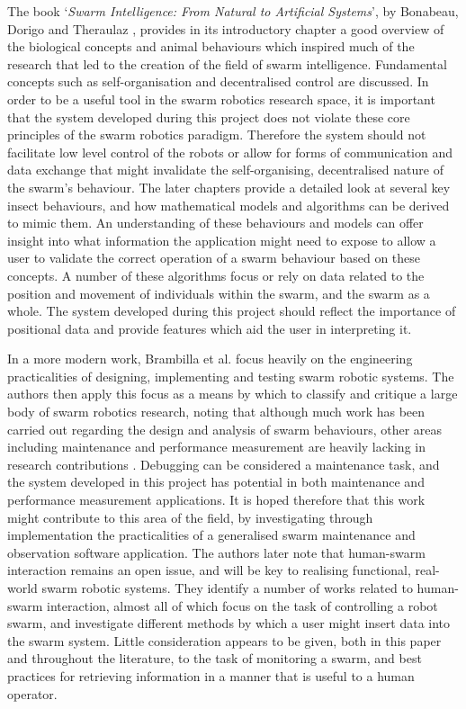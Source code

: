 The book `\textit{Swarm Intelligence: From Natural to Artificial Systems}', by Bonabeau, Dorigo and Theraulaz \cite{Bonabeau:1999}, provides in its introductory chapter a good overview of the biological concepts and animal behaviours which inspired much of the research that led to the creation of the field of swarm intelligence. Fundamental concepts such as self-organisation and decentralised control are discussed. In order to be a useful tool in the swarm robotics research space, it is important that the system developed during this project does not violate these core principles of the swarm robotics paradigm. Therefore the system should not facilitate low level control of the robots or allow for forms of communication and data exchange that might invalidate the self-organising, decentralised nature of the swarm's behaviour. The later chapters \cite{Bonabeau:1999} provide a detailed look at several key insect behaviours, and how mathematical models and algorithms can be derived to mimic them. An understanding of these behaviours and models can offer insight into what information the application might need to expose to allow a user to validate the correct operation of a swarm behaviour based on these concepts. A number of these algorithms focus or rely on data related to the position and movement of individuals within the swarm, and the swarm as a whole. The system developed during this project should reflect the importance of positional data and provide features which aid the user in interpreting it.

In a more modern work, Brambilla et al. \cite{Brambilla:2013} focus heavily on the engineering practicalities of designing, implementing and testing swarm robotic systems. The authors then apply this focus as a means by which to classify and critique a large body of swarm robotics research, noting that although much work has been carried out regarding the design and analysis of swarm behaviours, other areas including maintenance and performance measurement are heavily lacking in research contributions \cite{Brambilla:2013}. Debugging can be considered a maintenance task, and the system developed in this project has potential in both maintenance and performance measurement applications. It is hoped therefore that this work might contribute to this area of the field, by investigating through implementation the practicalities of a generalised swarm maintenance and observation software application. The authors \cite{Brambilla:2013} later note that human-swarm interaction remains an open issue, and will be key to realising functional, real-world swarm robotic systems. They identify a number of works related to human-swarm interaction, almost all of which focus on the task of controlling a robot swarm, and investigate different methods by which a user might insert data into the swarm system. Little consideration appears to be given, both in this paper and throughout the literature, to the task of monitoring a swarm, and best practices for retrieving information in a manner that is useful to a human operator.

